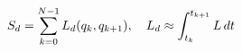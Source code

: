 \documentclass[preview]{standalone}
\begin{document}
\begin{align*}
\special{dvisvgm:raw <g id='unique000'>}S_d = \sum_{k=0}^{N-1} L_d(q_k, q_{k+1}),\quad L_d \approx \int_{t_k}^{t_{k+1}} L\, dt\special{dvisvgm:raw </g>}
\end{align*}
\end{document}
